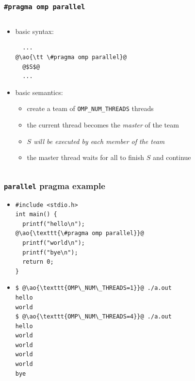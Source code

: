 \documentclass[12pt,dvipdfmx]{beamer}
\newcommand{\ao}[1]{{\color{blue}#1}}
\newcommand{\aka}[1]{{\color{red}#1}}
\begin{document}
\begin{frame}[fragile]
\frametitle{{\tt \#pragma omp parallel}}
\begin{columns}
  \begin{column}{0.6\textwidth}
\begin{itemize}
\item basic syntax:
\begin{lstlisting}
  ...
@\ao{\tt \#pragma omp parallel}@
  @$S$@
  ...
\end{lstlisting}
\item basic semantics: 
  \begin{itemize}
  \item create a team of {\tt OMP\_NUM\_THREADS} threads
  \item the current thread becomes the {\em master} of the team
  \item \aka{\em $S$ will be executed by each member of the team}
  \item the master thread waits for all to finish $S$ and continue
  \end{itemize}
\end{itemize}
  \end{column}

  \begin{column}{0.4\textwidth}
\def\svgwidth{\textwidth}
{\scriptsize }
  \end{column}
  
\end{columns}
\end{frame}


\begin{frame}[fragile]
\frametitle{{\tt parallel} pragma example}

\begin{itemize}
\item []
\begin{lstlisting}
#include <stdio.h>
int main() {
  printf("hello\n");
@\ao{\texttt{\#pragma omp parallel}}@
  printf("world\n");
  printf("bye\n");
  return 0;
}
\end{lstlisting}

\item []
\begin{lstlisting}
$ @\ao{\texttt{OMP\_NUM\_THREADS=1}}@ ./a.out
hello
world
$ @\ao{\texttt{OMP\_NUM\_THREADS=4}}@ ./a.out
hello
world
world
world
world
bye
\end{lstlisting}
\end{itemize}
\end{frame}
\end{document}
